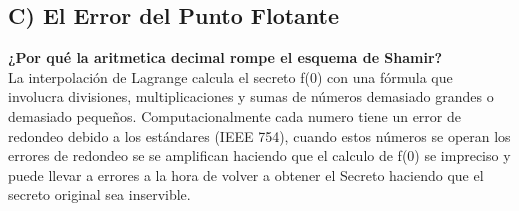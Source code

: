 \documentclass{article}
\begin{document}
\subsection{C) El Error del Punto Flotante}
\textbf{¿Por qué la aritmetica decimal rompe el esquema de Shamir?} \\

La interpolación de Lagrange calcula el secreto f(0) con una fórmula que involucra divisiones, multiplicaciones y sumas de números demasiado
grandes o demasiado pequeños. Computacionalmente cada numero tiene un error de redondeo debido a los estándares (IEEE 754), cuando estos números
se operan los errores de redondeo se se amplifican haciendo que el calculo de f(0) se impreciso y puede llevar a errores a la hora de volver a
obtener el Secreto haciendo que el secreto original sea inservible.
\end{document}
